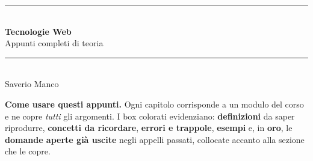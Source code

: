 \documentclass[11pt,a4paper,oneside]{report}
\begin{document}
\begin{titlepage}
\centering
\vspace*{2.5cm}
{\color{defblue}\rule{\textwidth}{2pt}}\\[0.9cm]
{\Huge\bfseries Tecnologie Web}\\[0.35cm]
{\LARGE Appunti completi di teoria}\\[0.9cm]
{\color{defblue}\rule{\textwidth}{2pt}}\\[1.6cm]
{\large Saverio Manco}\\[0.3cm]
\vspace*{2.2cm}
\begin{tcolorbox}[enhanced,colback=defblueback,colframe=defblue,arc=2mm,width=0.86\textwidth]
\textbf{Come usare questi appunti.} Ogni capitolo corrisponde a un modulo
del corso e ne copre \emph{tutti} gli argomenti. I box colorati evidenziano:
\textcolor{defblue}{\textbf{definizioni}} da saper riprodurre,
\textcolor{impviolet}{\textbf{concetti da ricordare}},
\textcolor{warnred}{\textbf{errori e trappole}},
\textcolor{okgreen}{\textbf{esempi}} e, in
\textcolor{examgold}{\textbf{oro}}, le \textbf{domande aperte gi\`a uscite}
negli appelli passati, collocate accanto alla sezione che le copre.
\end{tcolorbox}
\vfill
\end{titlepage}

\tableofcontents
\clearpage
















\end{document}
